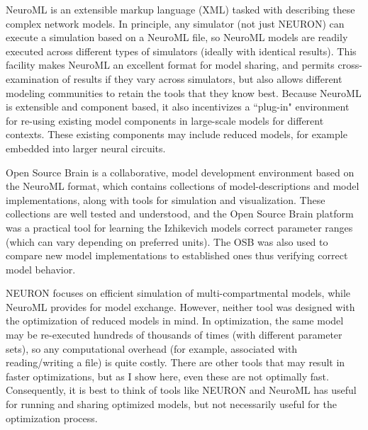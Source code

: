 NeuroML \citep{gleeson2010neuroml} is an extensible markup language (XML) tasked with describing these complex network models.
In principle, any simulator (not just NEURON) can execute a simulation based on a NeuroML file, so NeuroML models are readily executed across different types of simulators (ideally with identical results).
This facility makes NeuroML an excellent format for model sharing, and permits cross-examination of results if they vary across simulators, but also allows different modeling communities to retain the tools that they know best.
Because NeuroML is extensible and component based, it also incentivizes a ``plug-in" environment for re-using existing model components in large-scale models for different contexts.
These existing components may include reduced models, for example embedded into larger neural circuits. 


Open Source Brain \citep{gleeson2019open} is a collaborative, model development environment based on the NeuroML format, which contains collections of model-descriptions and model implementations, along with tools for simulation and visualization.
These collections are well tested and understood, and the Open Source Brain platform was a practical tool for learning the Izhikevich models correct parameter ranges (which can vary depending on preferred units).
The OSB was also used to compare new model implementations to established ones thus verifying correct model behavior.

NEURON focuses on efficient simulation of multi-compartmental models, while NeuroML provides for model exchange. 
However, neither tool was designed with the optimization of reduced models in mind.
In optimization, the same model may be re-executed hundreds of thousands of times (with different parameter sets), so any computational overhead (for example, associated with reading/writing a file) is quite costly.  
There are other tools that may result in faster optimizations, but as I show here, even these are not optimally fast.
Consequently, it is best to think of tools like NEURON and NeuroML has useful for running and sharing optimized models, but not necessarily useful for the optimization process.  

